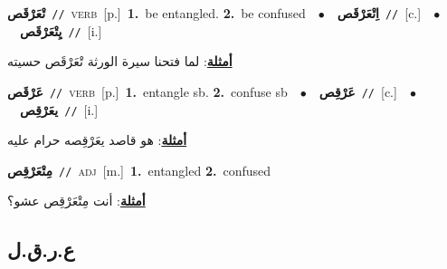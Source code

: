 \documentclass[10pt,a4paper,twoside]{article} %
\begin{document}
\begin{multicols}{2}
{\setlength\topsep{0pt}\textbf{\foreignlanguage{arabic}{تْعَرْقَص}}\ {\color{gray}\texttt{//}\color{black}}\ \textsc{verb}\ [p.]\ \textbf{1.}~be entangled.  \textbf{2.}~be confused\ \ $\bullet$\ \ \setlength\topsep{0pt}\textbf{\foreignlanguage{arabic}{اِتْعَرْقَص}}\ {\color{gray}\texttt{//}\color{black}}\ [c.]\ \ $\bullet$\ \ \setlength\topsep{0pt}\textbf{\foreignlanguage{arabic}{يِتْعَرْقَص}}\ {\color{gray}\texttt{//}\color{black}}\ [i.]\  \begin{flushright}\color{gray}\foreignlanguage{arabic}{\textbf{\underline{\foreignlanguage{arabic}{أمثلة}}}: لما فتحنا سيرة الورثة تْعَرْقَص حسيته}\end{flushright}\color{black}} \vspace{2mm}

{\setlength\topsep{0pt}\textbf{\foreignlanguage{arabic}{عَرْقَص}}\ {\color{gray}\texttt{//}\color{black}}\ \textsc{verb}\ [p.]\ \textbf{1.}~entangle sb.  \textbf{2.}~confuse sb\ \ $\bullet$\ \ \setlength\topsep{0pt}\textbf{\foreignlanguage{arabic}{عَرْقِص}}\ {\color{gray}\texttt{//}\color{black}}\ [c.]\ \ $\bullet$\ \ \setlength\topsep{0pt}\textbf{\foreignlanguage{arabic}{يعَرْقِص}}\ {\color{gray}\texttt{//}\color{black}}\ [i.]\  \begin{flushright}\color{gray}\foreignlanguage{arabic}{\textbf{\underline{\foreignlanguage{arabic}{أمثلة}}}: هو قاصد يعَرْقِصه حرام عليه}\end{flushright}\color{black}} \vspace{2mm}

{\setlength\topsep{0pt}\textbf{\foreignlanguage{arabic}{مِتْعَرْقِص}}\ {\color{gray}\texttt{//}\color{black}}\ \textsc{adj}\ [m.]\ \textbf{1.}~entangled  \textbf{2.}~confused\  \begin{flushright}\color{gray}\foreignlanguage{arabic}{\textbf{\underline{\foreignlanguage{arabic}{أمثلة}}}: أنت مِتْعَرْقِص عشو؟}\end{flushright}\color{black}} \vspace{2mm}

\vspace{-3mm}
\subsection*{\color{blue}\foreignlanguage{arabic}{ع.ر.ق.ل}\color{blue}{}} 


\end{multicols}
\end{document}

